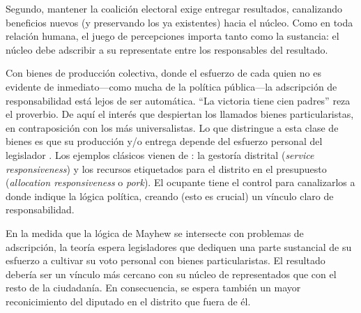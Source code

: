 \documentclass[letter,12pt]{article}
\begin{document}
Segundo, mantener la coalición electoral exige entregar resultados, canalizando beneficios nuevos (y preservando los ya existentes) hacia el núcleo. Como en toda relación humana, el juego de percepciones importa tanto como la sustancia: el núcleo debe adscribir a su representate entre los responsables del resultado. 

Con bienes de producción colectiva, donde el esfuerzo de cada quien no es evidente de inmediato---como mucha de la política pública---la adscripción de responsabilidad está lejos de ser automática. ``La victoria tiene cien padres'' reza el proverbio. De aquí el interés que despiertan los llamados bienes particularistas, en contraposición con los más universalistas. Lo que distringue a esta clase de bienes es que su producción y/o entrega depende del esfuerzo personal del legislador \citep{haggard.mccubbins.2001}. Los ejemplos clásicos vienen de \citet{cain.etal.1987}: la gestoría distrital (\emph{service responsiveness}) y los recursos etiquetados para el distrito en el presupuesto (\emph{allocation responsiveness} o \emph{pork}). El ocupante tiene el control para canalizarlos a donde indique la lógica política, creando (esto es crucial) un vínculo claro de responsabilidad.

En la medida que la lógica de Mayhew se intersecte con problemas de adscripción, la teoría espera legisladores que dediquen una parte sustancial de su esfuerzo a cultivar su voto personal con bienes particularistas. El resultado debería ser un vínculo más cercano con su núcleo de representados que con el resto de la ciudadanía. En consecuencia, se espera también un mayor reconicimiento del diputado en el distrito que fuera de él. 



\end{document}
